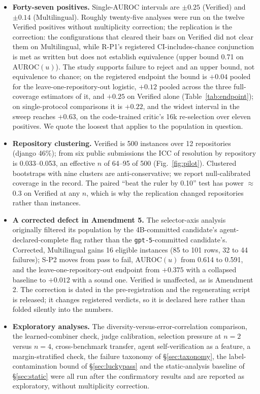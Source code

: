 \documentclass[11pt]{article}
\begin{document}
\begin{itemize}[leftmargin=1.2em,itemsep=1pt]
\item \textbf{Forty-seven positives.} Single-AUROC intervals are $\pm0.25$ (Verified) and $\pm0.14$ (Multilingual). Roughly twenty-five analyses were run on the twelve Verified positives without multiplicity correction; the replication is the correction: the configurations that cleared their bars on Verified did not clear them on Multilingual, while R-P1's registered CI-includes-chance conjunction is met as written but does not establish equivalence (upper bound 0.71 on $\mathrm{AUROC}(u)$). The study supports failure to reject and an upper bound, not equivalence to chance; on the registered endpoint the bound is $+0.04$ pooled for the leave-one-repository-out logistic, $+0.12$ pooled across the three full-coverage estimators of it, and $+0.25$ on Verified alone (Table~\ref{tab:endpoint}); on single-protocol comparisons it is $+0.22$, and the widest interval in the sweep reaches $+0.63$, on the code-trained critic's 16k re-selection over eleven positives. We quote the loosest that applies to the population in question.
\item \textbf{Repository clustering.} Verified is 500 instances over 12 repositories (django 46\%); from six public submissions the ICC of resolution by repository is 0.033--0.053, an effective $n$ of 64--95 of 500 (Fig.~\ref{fig:pilot}). Clustered bootstraps with nine clusters are anti-conservative; we report null-calibrated coverage in the record. The paired ``beat the ruler by 0.10'' test has power $\approx$0.3 on Verified at any $n$, which is why the replication changed repositories rather than instances.
\item \textbf{A corrected defect in Amendment 5.} The selector-axis analysis originally filtered its population by the 4B-committed candidate's agent-declared-complete flag rather than the \texttt{gpt-5}-committed candidate's. Corrected, Multilingual gains 16 eligible instances (85 to 101 rows, 32 to 44 failures); S-P2 moves from pass to fail, $\mathrm{AUROC}(u)$ from 0.614 to 0.591, and the leave-one-repository-out endpoint from $+0.375$ with a collapsed baseline to $+0.012$ with a sound one. Verified is unaffected, as is Amendment 2. The correction is dated in the pre-registration and the regenerating script is released; it changes registered verdicts, so it is declared here rather than folded silently into the numbers.
\item \textbf{Exploratory analyses.} The diversity-versus-error-correlation comparison, the learned-combiner check, judge calibration, selection pressure at $n{=}2$ versus $n{=}4$, cross-benchmark transfer, agent self-verification as a feature, a margin-stratified check, the failure taxonomy of \S\ref{sec:taxonomy}, the label-contamination bound of \S\ref{sec:luckypass} and the static-analysis baseline of \S\ref{sec:static} were all run after the confirmatory results and are reported as exploratory, without multiplicity correction.

\end{itemize}
\end{document}
